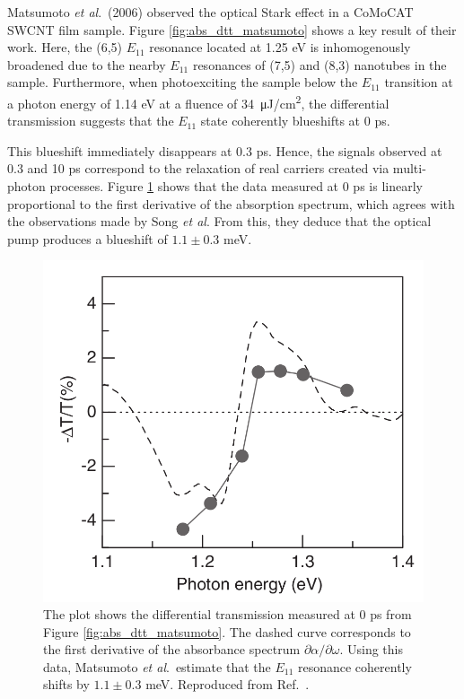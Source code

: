 Matsumoto \textit{et al}.\ (2006) observed the optical Stark effect in a CoMoCAT SWCNT film sample. Figure \ref{fig:abs_dtt_matsumoto} shows a key result of their work. Here, the (6,5) $E_{11}$ resonance located at 1.25 eV is inhomogenously broadened due to the nearby $E_{11}$ resonances of (7,5) and (8,3) nanotubes in the sample. Furthermore, when photoexciting the sample below the $E_{11}$ transition at a photon energy of 1.14 eV at a fluence of \SI{34}{\micro \joule / \cm\squared}, the differential transmission suggests that the $E_{11}$ state coherently blueshifts at 0 ps.

This blueshift immediately disappears at 0.3 ps. Hence, the signals observed at 0.3 and 10 ps correspond to the relaxation of real carriers created via multi-photon processes. Figure \ref{fig:dtt_matsumoto} shows that the data measured at 0 ps is linearly proportional to the first derivative of the absorption spectrum, which agrees with the observations made by Song \textit{et al}. From this, they deduce that the optical pump produces a blueshift of $1.1 \pm 0.3$ meV.

\begin{figure}[ht]
	\centering
	\includegraphics[scale=0.3]{images/chapter_prior_works/dtt_matsumoto}
	\caption{The plot shows the differential transmission measured at 0 ps from Figure \ref{fig:abs_dtt_matsumoto}. The dashed curve corresponds to the first derivative of the absorbance spectrum $\partial \alpha / \partial \omega$. Using this data, Matsumoto \textit{et al}.\ estimate that the $E_{11}$ resonance coherently shifts by $1.1 \pm 0.3$ meV. Reproduced from Ref.\ \cite{matsumoto2006optical}.}
	\label{fig:dtt_matsumoto}
\end{figure}

